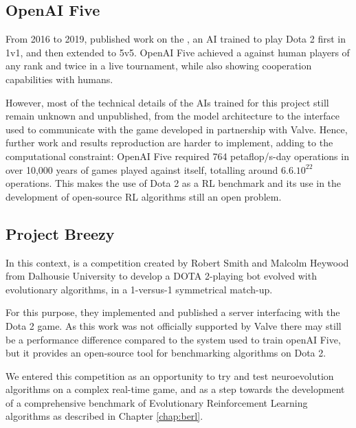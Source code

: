 \subsection{OpenAI Five}
From 2016 to 2019,  published work on the , an AI trained to play Dota 2 first in 1v1, and then extended to 5v5. OpenAI Five achieved a  against human players of any rank and  twice in a live tournament, while also showing cooperation capabilities with humans. 

However, most of the technical details of the AIs trained for this project still remain unknown and unpublished, from the model architecture to the interface used to communicate with the game developed in partnership with Valve. Hence, further work and results reproduction are harder to implement, adding to the computational constraint: OpenAI Five required 764 petaflop/s-day operations in over 10,000 years of games played against itself, totalling around $6.6.10^{22}$ operations. This makes the use of Dota 2 as a RL benchmark and its use in the development of open-source RL algorithms still an open problem. 

\subsection{Project Breezy}

In this context,  is a competition created by Robert Smith and Malcolm Heywood from Dalhousie University to develop a DOTA 2-playing bot evolved with evolutionary algorithms, in a 1-versus-1 symmetrical match-up. 

For this purpose, they implemented and published a server interfacing with the Dota 2 game. As this work was not officially supported by Valve there may still be a performance difference compared to the system used to train openAI Five, but it provides an open-source tool for benchmarking algorithms on Dota 2.

We entered this competition as an opportunity to try and test neuroevolution algorithms on a complex real-time game, and as a step towards the development of a comprehensive benchmark of Evolutionary Reinforcement Learning algorithms as described in Chapter \ref{chap:berl}.


